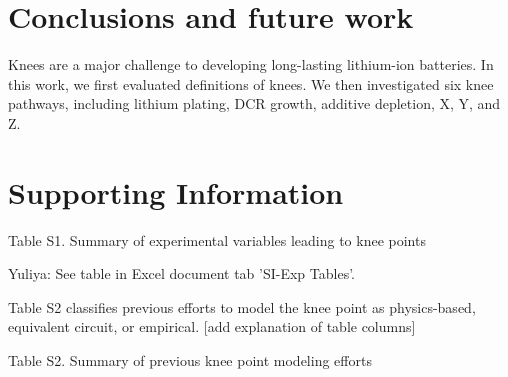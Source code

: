 \documentclass{article}
\begin{document}
\section{Conclusions and future work}

Knees are a major challenge to developing long-lasting lithium-ion batteries. In this work, we first evaluated definitions of knees. We then investigated six knee pathways, including lithium plating, DCR growth, additive depletion, X, Y, and Z. 

\section{Supporting Information}

 


Table S1. Summary of experimental variables leading to knee points


Yuliya: See table in Excel document tab 'SI-Exp Tables'. 


Table S2 classifies previous efforts to model the knee point as physics-based, equivalent circuit, or empirical. [add explanation of table columns]

Table S2. Summary of previous knee point modeling efforts



\end{document}
